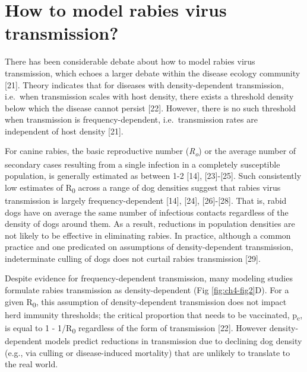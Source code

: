 \documentclass[
  oneside]{book}
\begin{document}
\hypertarget{how-to-model-rabies-virus-transmission}{%
\section{How to model rabies virus transmission?}\label{how-to-model-rabies-virus-transmission}}

There has been considerable debate about how to model rabies virus
transmission, which echoes a larger debate within the disease ecology
community {[}21{]}. Theory indicates that for diseases with
density-dependent transmission, i.e.~when transmission scales with host
density, there exists a threshold density below which the disease cannot
persist {[}22{]}. However, there is no such threshold when transmission is
frequency-dependent, i.e.~transmission rates are independent of host
density {[}21{]}.

For canine rabies, the basic reproductive number (\emph{R\textsubscript{o}}) or the average
number of secondary cases resulting from a single infection in a
completely susceptible population, is generally estimated as between 1-2
{[}14{]}, {[}23{]}-{[}25{]}. Such consistently low estimates of R\textsubscript{0} across a
range of dog densities suggest that rabies virus transmission is largely
frequency-dependent {[}14{]}, {[}24{]}, {[}26{]}-{[}28{]}. That is, rabid dogs
have on average the same number of infectious contacts regardless of the
density of dogs around them. As a result, reductions in population
densities are not likely to be effective in eliminating rabies. In
practice, although a common practice and one predicated on assumptions
of density-dependent transmission, indeterminate culling of dogs does
not curtail rabies transmission {[}29{]}.

Despite evidence for frequency-dependent transmission, many modeling
studies formulate rabies transmission as density-dependent (Fig \ref{fig:ch4-fig2}D). For a given R\textsubscript{0}, this assumption of density-dependent
transmission does not impact herd immunity thresholds; the critical
proportion that needs to be vaccinated, p\textsubscript{c}, is equal to 1 - 1/R\textsubscript{0}
regardless of the form of transmission {[}22{]}. However density-dependent
models predict reductions in transmission due to declining dog density
(e.g., via culling or disease-induced mortality) that are unlikely to
translate to the real world.
\end{document}

